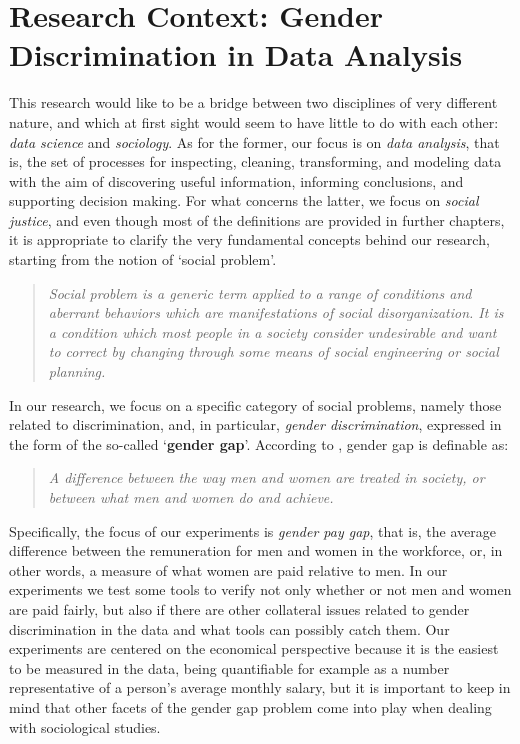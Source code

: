 \section{Research Context: Gender Discrimination in Data Analysis}
This research would like to be a bridge between two disciplines of very different nature, and which at first sight would seem to have little to do with each other: \textit{data science} and \textit{sociology}. As for the former, our focus is on \textit{data analysis}, that is, the set of processes for inspecting, cleaning, transforming, and modeling data with the aim of discovering useful information, informing conclusions, and supporting decision making. For what concerns the latter, we focus on \textit{social justice}, and even though most of the definitions are provided in further chapters, it is appropriate to clarify the very fundamental concepts behind our research, starting from the notion of `social problem'.
\begin{quote}\emph{Social problem is a generic term applied to a range of conditions and aberrant behaviors which are manifestations of social disorganization. It is a condition which most people in a society consider undesirable and want to correct by changing through some means of social engineering or social planning.} \cite{marschall1998oxford}\end{quote}

In our research, we focus on a specific category of social problems, namely those related to discrimination, and, in particular, \textit{gender discrimination}, expressed in the form of the so-called `\textbf{gender gap}'. According to \cite{cambridge2013gender}, gender gap is definable as:
\begin{quote}\emph{A difference between the way men and women are treated in society, or between what men and women do and achieve.} \cite{cambridge2013gender}\end{quote}

Specifically, the focus of our experiments is \textit{gender pay gap}, that is, the average difference between the remuneration for men and women in the workforce, or, in other words, a measure of what women are paid relative to men. In our experiments we test some tools to verify not only whether or not men and women are paid fairly, but also if there are other collateral issues related to gender discrimination in the data and what tools can possibly catch them.
Our experiments are centered on the economical perspective because it is the easiest to be measured in the data, being quantifiable for example as a number representative of a person's average monthly salary, but it is important to keep in mind that other facets of the gender gap problem come into play when dealing with sociological studies.


